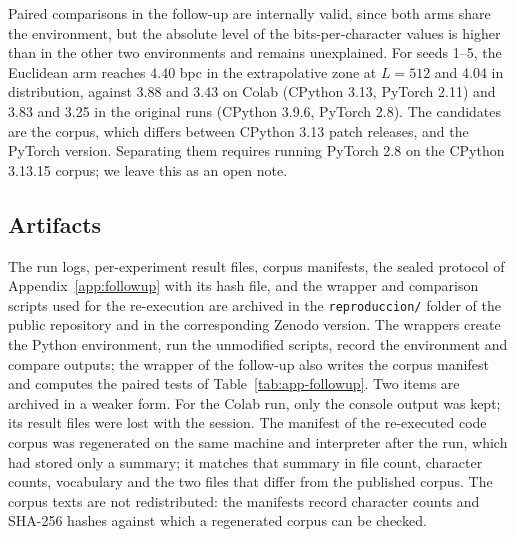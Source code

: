 \documentclass[11pt]{article}
\begin{document}
Paired comparisons in the follow-up are internally valid, since both arms share the environment, but the absolute level of the bits-per-character values is higher than in the other two environments and remains unexplained. For seeds 1--5, the Euclidean arm reaches 4.40 bpc in the extrapolative zone at $L{=}512$ and 4.04 in distribution, against 3.88 and 3.43 on Colab (CPython 3.13, PyTorch 2.11) and 3.83 and 3.25 in the original runs (CPython 3.9.6, PyTorch 2.8). The candidates are the corpus, which differs between CPython 3.13 patch releases, and the PyTorch version. Separating them requires running PyTorch 2.8 on the CPython 3.13.15 corpus; we leave this as an open note.

\subsection{Artifacts}\label{app:artifacts}

The run logs, per-experiment result files, corpus manifests, the sealed protocol of Appendix~\ref{app:followup} with its hash file, and the wrapper and comparison scripts used for the re-execution are archived in the \texttt{reproduccion/} folder of the public repository and in the corresponding Zenodo version. The wrappers create the Python environment, run the unmodified scripts, record the environment and compare outputs; the wrapper of the follow-up also writes the corpus manifest and computes the paired tests of Table~\ref{tab:app-followup}. Two items are archived in a weaker form. For the Colab run, only the console output was kept; its result files were lost with the session. The manifest of the re-executed code corpus was regenerated on the same machine and interpreter after the run, which had stored only a summary; it matches that summary in file count, character counts, vocabulary and the two files that differ from the published corpus. The corpus texts are not redistributed: the manifests record character counts and SHA-256 hashes against which a regenerated corpus can be checked.
\end{document}
